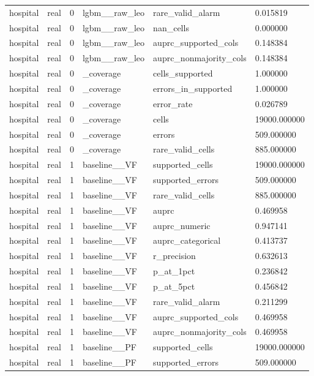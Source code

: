 \begin{tabular}{llllll}
hospital & real & 0 & lgbm\_\_raw\_leo & rare\_valid\_alarm & 0.015819 \\
hospital & real & 0 & lgbm\_\_raw\_leo & nan\_cells & 0.000000 \\
hospital & real & 0 & lgbm\_\_raw\_leo & auprc\_supported\_cols & 0.148384 \\
hospital & real & 0 & lgbm\_\_raw\_leo & auprc\_nonmajority\_cols & 0.148384 \\
hospital & real & 0 & \_coverage & cells\_supported & 1.000000 \\
hospital & real & 0 & \_coverage & errors\_in\_supported & 1.000000 \\
hospital & real & 0 & \_coverage & error\_rate & 0.026789 \\
hospital & real & 0 & \_coverage & cells & 19000.000000 \\
hospital & real & 0 & \_coverage & errors & 509.000000 \\
hospital & real & 0 & \_coverage & rare\_valid\_cells & 885.000000 \\
hospital & real & 1 & baseline\_\_VF & supported\_cells & 19000.000000 \\
hospital & real & 1 & baseline\_\_VF & supported\_errors & 509.000000 \\
hospital & real & 1 & baseline\_\_VF & rare\_valid\_cells & 885.000000 \\
hospital & real & 1 & baseline\_\_VF & auprc & 0.469958 \\
hospital & real & 1 & baseline\_\_VF & auprc\_numeric & 0.947141 \\
hospital & real & 1 & baseline\_\_VF & auprc\_categorical & 0.413737 \\
hospital & real & 1 & baseline\_\_VF & r\_precision & 0.632613 \\
hospital & real & 1 & baseline\_\_VF & p\_at\_1pct & 0.236842 \\
hospital & real & 1 & baseline\_\_VF & p\_at\_5pct & 0.456842 \\
hospital & real & 1 & baseline\_\_VF & rare\_valid\_alarm & 0.211299 \\
hospital & real & 1 & baseline\_\_VF & auprc\_supported\_cols & 0.469958 \\
hospital & real & 1 & baseline\_\_VF & auprc\_nonmajority\_cols & 0.469958 \\
hospital & real & 1 & baseline\_\_PF & supported\_cells & 19000.000000 \\
hospital & real & 1 & baseline\_\_PF & supported\_errors & 509.000000 \\

\end{tabular}
